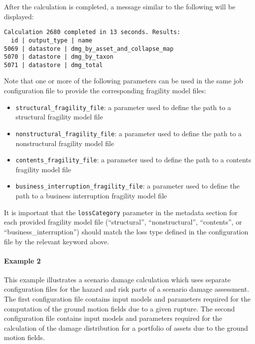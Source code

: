 After the calculation is completed, a message similar to the following will be
displayed:

\begin{Verbatim}[frame=single, commandchars=\\\{\}, samepage=true]
Calculation 2680 completed in 13 seconds. Results:
  id | output_type | name
5069 | datastore | dmg_by_asset_and_collapse_map
5070 | datastore | dmg_by_taxon
5071 | datastore | dmg_total
\end{Verbatim}


Note that one or more of the following parameters can be used in the same job
configuration file to provide the corresponding fragility model files:

\begin{itemize}

  \item \Verb+structural_fragility_file+: a parameter used to define the path
    to a structural \gls{fragility model} file

  \item \Verb+nonstructural_fragility_file+: a parameter used to define the path
    to a nonstructural \gls{fragility model} file

  \item \Verb+contents_fragility_file+: a parameter used to define the path
    to a contents \gls{fragility model} file

  \item \Verb+business_interruption_fragility_file+: a parameter used to define
    the path to a business interruption \gls{fragility model} file

\end{itemize}

It is important that the \Verb+lossCategory+ parameter in the metadata section
for each provided fragility model file (``structural'', ``nonstructural'',
``contents'', or ``business\_interruption'') should match the loss type
defined in the configuration file by the relevant keyword above.


\paragraph{Example 2}

This example illustrates a scenario damage calculation which uses separate
configuration files for the hazard and risk parts of a scenario damage
assessment. The first configuration file contains input models and parameters
required for the computation of the ground motion fields due to a given
rupture. The second configuration file contains input models and parameters
required for the calculation of the damage distribution for a portfolio of
assets due to the ground motion fields.


